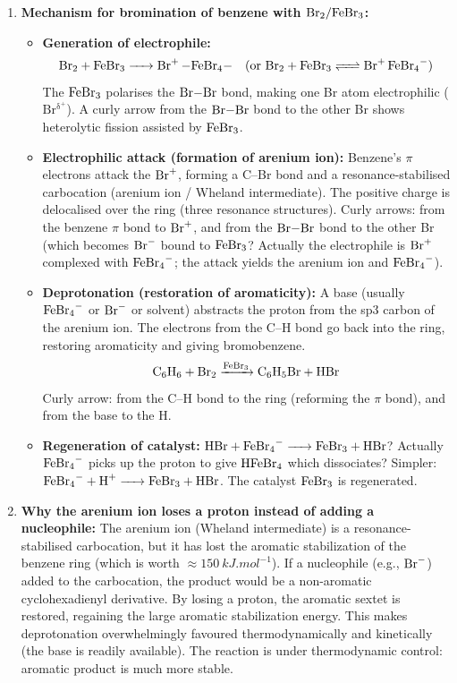 \documentclass[11pt]{article}
\begin{document}
\begin{corrige}
\begin{enumerate}
\item \textbf{Mechanism for bromination of benzene with \(\ce{Br2}/\ce{FeBr3}\):}

\begin{itemize}
\item \textbf{Generation of electrophile:}
\[
\ce{Br2 + FeBr3 -> Br+ -FeBr4-} \quad (\text{or } \ce{Br2 + FeBr3 <=> Br+ FeBr4-})
\]
The \(\ce{FeBr3}\) polarises the \(\ce{Br-Br}\) bond, making one Br atom electrophilic (\(\ensuremath{\mathrm{Br^{\delta^{+}}}}\)). A curly arrow from the \(\ce{Br-Br}\) bond to the other Br shows heterolytic fission assisted by \(\ce{FeBr3}\).

\item \textbf{Electrophilic attack (formation of arenium ion):}
Benzene's \(\pi\) electrons attack the \(\ce{Br+}\), forming a C–Br bond and a resonance-stabilised carbocation (arenium ion / Wheland intermediate). The positive charge is delocalised over the ring (three resonance structures). Curly arrows: from the benzene \(\pi\) bond to \(\ce{Br+}\), and from the \(\ce{Br-Br}\) bond to the other Br (which becomes \(\ce{Br-}\) bound to \(\ce{FeBr3}\)? Actually the electrophile is \(\ce{Br+}\) complexed with \(\ce{FeBr4-}\); the attack yields the arenium ion and \(\ce{FeBr4-}\)).

\item \textbf{Deprotonation (restoration of aromaticity):}
A base (usually \(\ce{FeBr4-}\) or \(\ce{Br-}\) or solvent) abstracts the proton from the sp3 carbon of the arenium ion. The electrons from the C–H bond go back into the ring, restoring aromaticity and giving bromobenzene.
\[
\ce{C6H6 + Br2 ->[FeBr3] C6H5Br + HBr}
\]
Curly arrow: from the C–H bond to the ring (reforming the \(\pi\) bond), and from the base to the H.

\item \textbf{Regeneration of catalyst:}
\(\ce{HBr + FeBr4- -> FeBr3 + HBr}\)? Actually \(\ce{FeBr4-}\) picks up the proton to give \(\ce{HFeBr4}\) which dissociates? Simpler: \(\ce{FeBr4- + H+ -> FeBr3 + HBr}\). The catalyst \(\ce{FeBr3}\) is regenerated.
\end{itemize}

\item \textbf{Why the arenium ion loses a proton instead of adding a nucleophile:}
The arenium ion (Wheland intermediate) is a resonance-stabilised carbocation, but it has lost the aromatic stabilization of the benzene ring (which is worth \(\approx \SI{150}{kJ.mol^{-1}}\)). If a nucleophile (e.g., \(\ce{Br-}\)) added to the carbocation, the product would be a non-aromatic cyclohexadienyl derivative. By losing a proton, the aromatic sextet is restored, regaining the large aromatic stabilization energy. This makes deprotonation overwhelmingly favoured thermodynamically and kinetically (the base is readily available). The reaction is under thermodynamic control: aromatic product is much more stable.


\end{enumerate}
\end{corrige}
\end{document}
